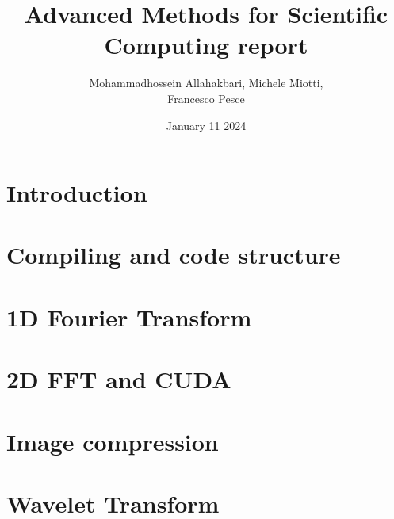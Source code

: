 \documentclass{article}
\title{Advanced Methods for Scientific Computing report}
\author{Mohammadhossein Allahakbari, Michele Miotti, \\Francesco Pesce}
\date{January 11 2024}
\begin{document}
\maketitle


\section{Introduction}
	

\section{Compiling and code structure}
	

\section{1D Fourier Transform}
	 

\section{2D FFT and CUDA}
	 

\section{Image compression}
	 

\section{Wavelet Transform}\label{sec:wavelet}
	 




\end{document}
